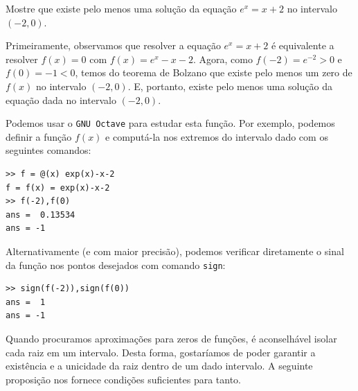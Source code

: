 


\begin{ex}\label{ex:teorema_de_Bolzano}
Mostre que existe pelo menos uma solução da equação $e^x=x+2$ no intervalo $(-2,0)$.
\end{ex}
\begin{sol}
Primeiramente, observamos que resolver a equação $e^x = x+2$ é equivalente a resolver $f(x) = 0$ com $f(x)=e^x-x-2$. Agora, como $f(-2)=e^{-2}>0$ e $f(0)=-1<0$, temos do teorema de Bolzano que existe pelo menos um zero de $f(x)$ no intervalo $(-2, 0)$. E, portanto, existe pelo menos uma solução da equação dada no intervalo $(-2, 0)$.

Podemos usar o \verb+GNU Octave+ para estudar esta função. Por exemplo, podemos definir a função $f(x)$ e computá-la nos extremos do intervalo dado com os seguintes comandos:
\begin{verbatim}
>> f = @(x) exp(x)-x-2
f = f(x) = exp(x)-x-2
>> f(-2),f(0)
ans =  0.13534
ans = -1
\end{verbatim}
Alternativamente (e com maior precisão), podemos verificar diretamente o sinal da função nos pontos desejados com comando \verb+sign+:
\begin{verbatim}
>> sign(f(-2)),sign(f(0))
ans =  1
ans = -1
\end{verbatim}
\end{sol}

Quando procuramos aproximações para zeros de funções, é aconselhável isolar cada raiz em um intervalo. Desta forma, gostaríamos de poder garantir a existência e a unicidade da raiz dentro de um dado intervalo. A seguinte proposição nos fornece condições suficientes para tanto.

